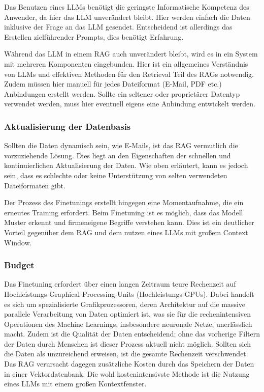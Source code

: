 Das Benutzen eines LLMs benötigt die geringste Informatische Kompetenz des Anwender, da hier das LLM unverändert bleibt.
Hier werden einfach die Daten inklusive der Frage an das LLM gesendet.
Entscheidend ist allerdings das Erstellen zielführender Prompts, dies benötigt Erfahrung.

Während das LLM in einem RAG auch unverändert bleibt, wird es in ein System mit mehreren Komponenten eingebunden.
Hier ist ein allgemeines Verständnis von LLMs und effektiven Methoden für den Retrieval Teil des RAGs notwendig.
Zudem müssen hier manuell für jedes Dateiformat (E-Mail, PDF etc.) Anbindungen erstellt werden. Sollte ein seltener oder proprietärer Datentyp verwendet werden, muss hier eventuell eigens eine Anbindung entwickelt werden.
\subsubsection{Aktualisierung der Datenbasis}
Sollten die Daten dynamisch sein, wie E-Mails, ist das RAG vermutlich die vorzuziehende Lösung. Dies liegt an den Eigenschaften der schnellen und kontinuierlichen Aktualisierung der Daten.
Wie oben erläutert, kann es jedoch sein, dass es schlechte oder keine Unterstützung von selten verwendeten Dateiformaten gibt.

Der Prozess des Finetunings erstellt hingegen eine Momentaufnahme, die ein erneutes Training erfordert.
Beim Finetuning ist es möglich, dass das Modell Muster erkennt und firmeneigene Begriffe verstehen kann. Dies ist ein deutlicher Vorteil gegenüber dem RAG und dem nutzen eines LLMs mit großem Context Window.


\subsubsection{Budget}
Das Finetuning erfordert über einen langen Zeitraum teure Rechenzeit auf Hochleistungs-Graphical-Processing-Units (Hochleistungs-GPUs).
Dabei handelt es sich um spezialisierte Grafikprozessoren, deren Architektur auf die massive parallele Verarbeitung von Daten optimiert ist, was sie für die rechenintensiven Operationen des Machine Learnings, insbesondere neuronale Netze, unerlässlich macht.
Zudem ist die Qualität der Daten entscheidend; ohne das vorherige Filtern der Daten durch Menschen ist dieser Prozess aktuell nicht möglich. Sollten sich die Daten als unzureichend erweisen, ist die gesamte Rechenzeit verschwendet.
Das RAG verursacht dagegen zusätzliche Kosten durch das Speichern der Daten in einer Vektordatenbank.
Die wohl kostenintensivste Methode ist die Nutzung eines LLMs mit einem großen Kontextfenster.


